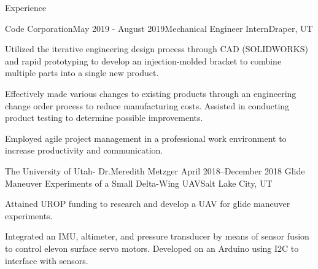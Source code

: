 \documentclass{resume}
\begin{document}
\begin{rSection}{Experience}
    \begin{rSubsection}{Code Corporation}{May 2019 - August 2019}{Mechanical Engineer Intern}{Draper, UT}
    \item Utilized the iterative engineering design process through CAD (SOLIDWORKS) and rapid prototyping to develop an injection-molded bracket to combine multiple parts into a single new product.  
    \item Effectively made various changes to existing products through an engineering change order process to reduce manufacturing costs.  Assisted in conducting product testing to determine possible improvements.  
    \item Employed agile project management in a professional work environment to increase productivity and communication.
    \end{rSubsection}

    \begin{rSubsection}{The University of Utah- Dr.Meredith Metzger
        }{April 2018–December 2018
        }{Glide Maneuver Experiments of a Small Delta-Wing UAV}{Salt Lake City, UT}
    \item Attained UROP funding to research and develop a UAV for glide maneuver experiments.
    \item Integrated an IMU, altimeter, and pressure transducer by means of sensor fusion to control elevon surface servo motors. Developed on an Arduino using I2C to interface with sensors.
    \end{rSubsection}
  
  \end{rSection}
\end{document}
